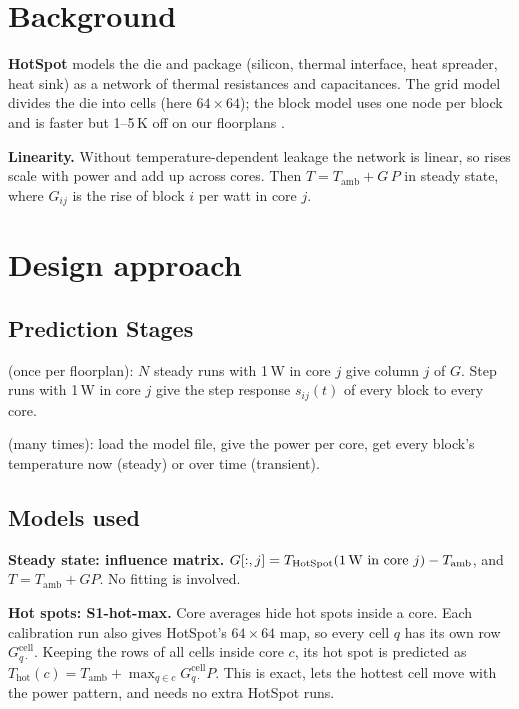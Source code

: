 \documentclass[11pt,a4paper]{article}
\begin{document}
\section{Background}
\textbf{HotSpot} \cite{hotspot} models the die and package (silicon, thermal interface, heat
spreader, heat sink) as a network of thermal resistances and capacitances. The grid model divides
the die into cells (here $64\times64$); the block model uses one node per block and is faster but
1--5\,K off on our floorplans \cite{hotspot4}.

\textbf{Linearity.} Without temperature-dependent leakage the network is linear, so rises scale
with power and add up across cores. Then $T = T_\text{amb} + G\,P$ in steady state, where
$G_{ij}$ is the rise of block $i$ per watt in core $j$.

\section{Design approach}

\subsection{Prediction Stages}
\begin{description}[leftmargin=1.2em]
  \item[Calibration] (once per floorplan): $N$ steady runs with 1\,W in core $j$ give column $j$ of
        $G$. Step runs with 1\,W in core $j$ give the step response $s_{ij}(t)$ of every block to
        every core.
  \item[Prediction] (many times): load the model file, give the power per core, get every block's
        temperature now (steady) or over time (transient).
\end{description}

\subsection{Models used}
\textbf{Steady state: influence matrix.} $G[:,j] = T_\text{HotSpot}(\text{1\,W in core } j) -
T_\text{amb}$, and $T = T_\text{amb} + G P$. No fitting is involved.

\textbf{Hot spots: S1-hot-max.} Core averages hide hot spots inside a core. Each calibration run
also gives HotSpot's $64\times64$ map, so every cell $q$ has its own row $G^\text{cell}_{q\cdot}$.
Keeping the rows of all cells inside core $c$, its hot spot is predicted as
$T_\text{hot}(c) = T_\text{amb} + \max_{q \in c} G^\text{cell}_{q\cdot} P$. This is exact, lets
the hottest cell move with the power pattern, and needs no extra HotSpot runs.
\end{document}

